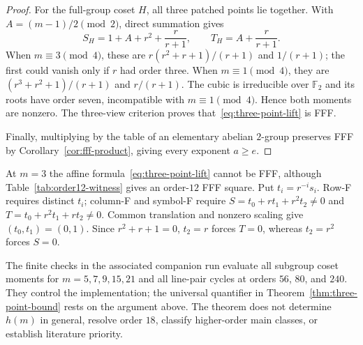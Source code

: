 \begin{proof}
For the full-group coset $H$, all three patched points lie together.  With
$A=(m-1)/2\pmod2$, direct summation gives
\[
 S_H=1+A+r^2+\frac r{r+1},\qquad
 T_H=A+\frac r{r+1}.
\]
When $m\equiv3\pmod4$, these are
$r(r^2+r+1)/(r+1)$ and $1/(r+1)$; the first could vanish only if $r$
had order three.  When $m\equiv1\pmod4$, they are
$(r^3+r^2+1)/(r+1)$ and $r/(r+1)$.  The cubic is irreducible over
$\mathbb F_2$ and its roots have order seven, incompatible with
$m\equiv1\pmod4$.  Hence both moments are nonzero.  The three-view
criterion proves that~\eqref{eq:three-point-lift} is FFF.

Finally, multiplying by the table of an elementary abelian $2$-group
preserves FFF by Corollary~\ref{cor:fff-product}, giving every exponent
$a\geq e$.
\end{proof}

\begin{remark}
At $m=3$ the affine formula~\eqref{eq:three-point-lift} cannot be FFF,
although Table~\ref{tab:order12-witness} gives an order-$12$ FFF square.
Put $t_i=r^{-i}s_i$. Row-F requires distinct $t_i$; column-F and symbol-F
require $S=t_0+rt_1+r^2t_2\ne0$ and $T=t_0+r^2t_1+rt_2\ne0$.
Common translation and nonzero scaling give $(t_0,t_1)=(0,1)$.
Since $r^2+r+1=0$, $t_2=r$ forces $T=0$, whereas $t_2=r^2$
forces $S=0$.
\end{remark}

The finite checks in the associated companion run evaluate all subgroup
coset moments for $m=5,7,9,15,21$ and all line-pair cycles at orders
$56$, $80$, and $240$.  They control the implementation; the universal
quantifier in Theorem~\ref{thm:three-point-bound} rests on the argument
above.  The theorem does not determine $h(m)$ in general, resolve order
$18$, classify higher-order main classes, or establish literature priority.

